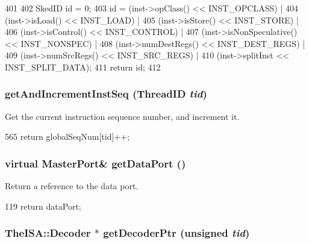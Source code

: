 \begin{DoxyCode}
401     {
402         SkedID id = 0;
403         id = (inst->opClass() << INST_OPCLASS) |
404             (inst->isLoad() << INST_LOAD) |
405             (inst->isStore() << INST_STORE) |
406             (inst->isControl() << INST_CONTROL) |
407             (inst->isNonSpeculative() << INST_NONSPEC) |
408             (inst->numDestRegs() << INST_DEST_REGS) |
409             (inst->numSrcRegs() << INST_SRC_REGS) |
410             (inst->splitInst << INST_SPLIT_DATA);
411         return id;
412     }
\end{DoxyCode}
\hypertarget{classInOrderCPU_a67230d0effe2bb65efc346f6bf296bdb}{
\subsubsection[{getAndIncrementInstSeq}]{ getAndIncrementInstSeq ({\bf ThreadID} {\em tid})}}
\label{classInOrderCPU_a67230d0effe2bb65efc346f6bf296bdb}
Get the current instruction sequence number, and increment it. 


\begin{DoxyCode}
565     { return globalSeqNum[tid]++; }
\end{DoxyCode}
\hypertarget{classInOrderCPU_aeea6b55ae1c4be53c21dbee434b221d4}{
\subsubsection[{getDataPort}]{\setlength{\rightskip}{0pt plus 5cm}virtual {\bf MasterPort}\& getDataPort ()}}
\label{classInOrderCPU_aeea6b55ae1c4be53c21dbee434b221d4}
Return a reference to the data port. 


\begin{DoxyCode}
119 { return dataPort; }
\end{DoxyCode}
\hypertarget{classInOrderCPU_a3c58d1da1d6e12bae2927d14cd7289ad}{
\subsubsection[{getDecoderPtr}]{\setlength{\rightskip}{0pt plus 5cm}TheISA::Decoder $\ast$ getDecoderPtr (unsigned {\em tid})}}
\label{classInOrderCPU_a3c58d1da1d6e12bae2927d14cd7289ad}



